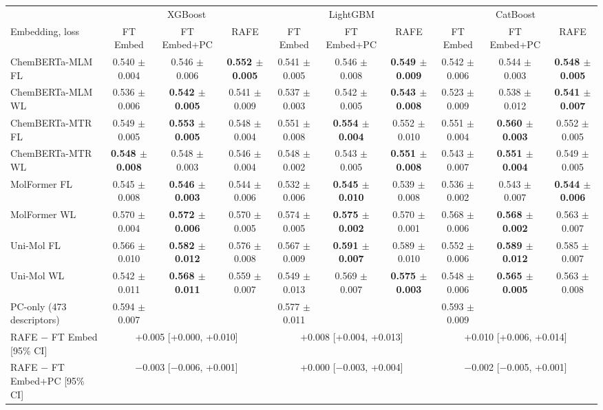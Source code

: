 \begin{tabular}{@{}lccccccccc@{}}
\toprule
 & \multicolumn{3}{c}{XGBoost} & \multicolumn{3}{c}{LightGBM} & \multicolumn{3}{c}{CatBoost} \\
\cmidrule(lr){2-4} \cmidrule(lr){5-7} \cmidrule(lr){8-10}
Embedding, loss & FT Embed & FT Embed+PC & RAFE & FT Embed & FT Embed+PC & RAFE & FT Embed & FT Embed+PC & RAFE \\
\midrule
ChemBERTa-MLM FL & 0.540 $\pm$ 0.004 & 0.546 $\pm$ 0.006 & \textbf{0.552 $\pm$ 0.005} & 0.541 $\pm$ 0.005 & 0.546 $\pm$ 0.008 & \textbf{0.549 $\pm$ 0.009} & 0.542 $\pm$ 0.006 & 0.544 $\pm$ 0.003 & \textbf{0.548 $\pm$ 0.005} \\
ChemBERTa-MLM WL & 0.536 $\pm$ 0.006 & \textbf{0.542 $\pm$ 0.005} & 0.541 $\pm$ 0.009 & 0.537 $\pm$ 0.003 & 0.542 $\pm$ 0.005 & \textbf{0.543 $\pm$ 0.008} & 0.523 $\pm$ 0.009 & 0.538 $\pm$ 0.012 & \textbf{0.541 $\pm$ 0.007} \\
ChemBERTa-MTR FL & 0.549 $\pm$ 0.005 & \textbf{0.553 $\pm$ 0.005} & 0.548 $\pm$ 0.004 & 0.551 $\pm$ 0.008 & \textbf{0.554 $\pm$ 0.004} & 0.552 $\pm$ 0.010 & 0.551 $\pm$ 0.004 & \textbf{0.560 $\pm$ 0.003} & 0.552 $\pm$ 0.005 \\
ChemBERTa-MTR WL & \textbf{0.548 $\pm$ 0.008} & 0.548 $\pm$ 0.003 & 0.546 $\pm$ 0.004 & 0.548 $\pm$ 0.002 & 0.543 $\pm$ 0.005 & \textbf{0.551 $\pm$ 0.008} & 0.543 $\pm$ 0.007 & \textbf{0.551 $\pm$ 0.004} & 0.549 $\pm$ 0.005 \\
MolFormer FL & 0.545 $\pm$ 0.008 & \textbf{0.546 $\pm$ 0.003} & 0.544 $\pm$ 0.006 & 0.532 $\pm$ 0.006 & \textbf{0.545 $\pm$ 0.010} & 0.539 $\pm$ 0.008 & 0.536 $\pm$ 0.002 & 0.543 $\pm$ 0.007 & \textbf{0.544 $\pm$ 0.006} \\
MolFormer WL & 0.570 $\pm$ 0.004 & \textbf{0.572 $\pm$ 0.006} & 0.570 $\pm$ 0.005 & 0.574 $\pm$ 0.005 & \textbf{0.575 $\pm$ 0.002} & 0.570 $\pm$ 0.001 & 0.568 $\pm$ 0.006 & \textbf{0.568 $\pm$ 0.002} & 0.563 $\pm$ 0.007 \\
Uni-Mol FL & 0.566 $\pm$ 0.010 & \textbf{0.582 $\pm$ 0.012} & 0.576 $\pm$ 0.008 & 0.567 $\pm$ 0.009 & \textbf{0.591 $\pm$ 0.007} & 0.589 $\pm$ 0.010 & 0.552 $\pm$ 0.006 & \textbf{0.589 $\pm$ 0.012} & 0.585 $\pm$ 0.007 \\
Uni-Mol WL & 0.542 $\pm$ 0.011 & \textbf{0.568 $\pm$ 0.011} & 0.559 $\pm$ 0.007 & 0.549 $\pm$ 0.013 & 0.569 $\pm$ 0.007 & \textbf{0.575 $\pm$ 0.003} & 0.548 $\pm$ 0.006 & \textbf{0.565 $\pm$ 0.005} & 0.563 $\pm$ 0.008 \\
\midrule
PC-only (473 descriptors) & 0.594 $\pm$ 0.007 &  &  & 0.577 $\pm$ 0.011 &  &  & 0.593 $\pm$ 0.009 &  &  \\
RAFE $-$ FT Embed [95\% CI] & \multicolumn{3}{c}{+0.005 [+0.000, +0.010]} & \multicolumn{3}{c}{+0.008 [+0.004, +0.013]} & \multicolumn{3}{c}{+0.010 [+0.006, +0.014]} \\
RAFE $-$ FT Embed+PC [95\% CI] & \multicolumn{3}{c}{$-$0.003 [$-$0.006, +0.001]} & \multicolumn{3}{c}{+0.000 [$-$0.003, +0.004]} & \multicolumn{3}{c}{$-$0.002 [$-$0.005, +0.001]} \\
\bottomrule
\end{tabular}
